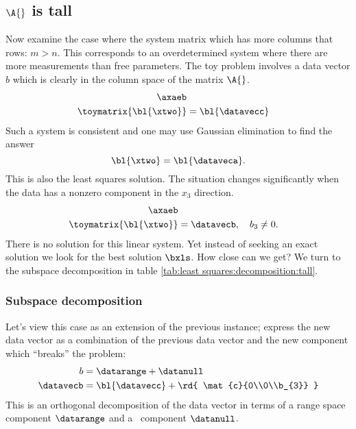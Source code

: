 

\subsection{$\A{}$ is tall}
Now examine the case where the system matrix which has more columns that rows: $m > n$. This corresponds to an overdetermined system where there are more measurements than free parameters.
The toy problem involves a data vector $b$ which is clearly in the column space of the matrix $\A{}$.
\begin{equation}
\begin{split}
  \axaeb \\
  \toymatrix {\bl{ \xtwo }} &= {\bl{ \datavecc }}
  \label{eqn:toy:system:tall}
 \end{split}
\end{equation}
%
Such a system is consistent and one may use Gaussian elimination to find the answer
\begin{equation}
  {\bl{ \xtwo }} = {\bl{ \dataveca }}.
  \label{eq:ls:rudiments:soln}
\end{equation}
This is also the least squares solution. The situation changes significantly when the data has a nonzero component in the $x_{3}$ direction.
\begin{equation}
  \begin{split}
    \axaeb \\
    \toymatrix {\bl{ \xtwo }} &= \datavecb, \quad b_{3} \ne 0.
 \end{split}
 \label{eqn:tall:inconsistent}
\end{equation}
There is no solution for this linear system. Yet instead of seeking an exact solution we look for the best solution $\bxls$. How close can we get? We turn to the subspace decomposition in table \eqref{tab:least squares:decomposition:tall}.
%

\subsubsection{Subspace decomposition}
Let's view this case as an extension of the previous instance; express the new data vector as a combination of the previous data vector and the new component which ``breaks'' the problem:
%
\begin{equation}
  \begin{split}
     b &= \datarange + \datanull \\
     \datavecb &= {\bl{ \datavecc }} + {\rd{ \mat{c}{0\\0\\b_{3}} }}
  \end{split}
\end{equation}
%
This is an orthogonal decomposition of the data vector in terms of a range space component $\datarange$ and a \ns \ component $\datanull$. 


